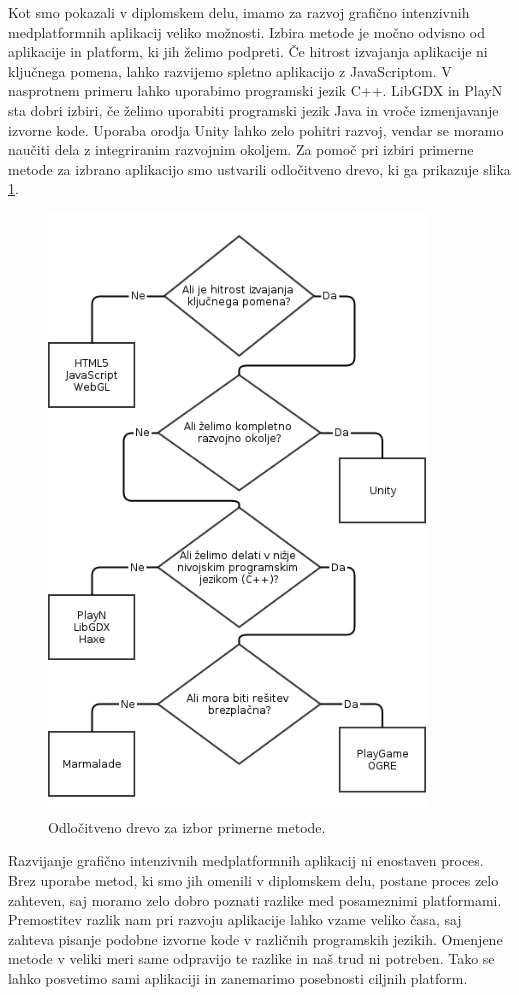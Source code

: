 Kot smo pokazali v diplomskem delu, imamo za razvoj grafično intenzivnih medplatformnih aplikacij veliko možnosti. Izbira metode je močno odvisno od aplikacije in platform, ki jih želimo podpreti. Če hitrost izvajanja aplikacije ni ključnega pomena, lahko razvijemo spletno aplikacijo z JavaScriptom. V nasprotnem primeru lahko uporabimo programski jezik C++. LibGDX in PlayN sta dobri izbiri, če želimo uporabiti programski jezik Java in vroče izmenjavanje izvorne kode. Uporaba orodja Unity lahko zelo pohitri razvoj, vendar se moramo naučiti dela z integriranim razvojnim okoljem. Za pomoč pri izbiri primerne metode za izbrano aplikacijo smo ustvarili odločitveno drevo, ki ga prikazuje slika \ref{drevo}. 

\begin{figure}
\begin{center}
\includegraphics[width=10cm]{pic/drevo.png}
\end{center}
\caption{Odločitveno drevo za izbor primerne metode.}
\label{drevo}
\end{figure} 


Razvijanje grafično intenzivnih medplatformnih aplikacij ni enostaven proces. Brez uporabe metod, ki smo jih omenili v diplomskem delu, postane proces zelo zahteven, saj moramo zelo dobro poznati razlike med posameznimi platformami. Premostitev razlik nam pri razvoju aplikacije lahko vzame veliko časa, saj zahteva pisanje podobne izvorne kode v različnih programskih jezikih. Omenjene metode v veliki meri same odpravijo te razlike in naš trud ni potreben. Tako se lahko posvetimo sami aplikaciji in zanemarimo posebnosti ciljnih platform.